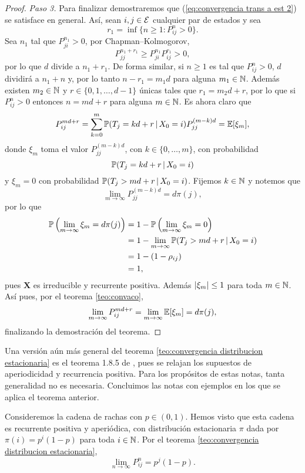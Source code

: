 \begin{proof}
    \emph{Paso 3.} Para finalizar demostraremos que (\ref{eq:convergencia trans a est 2}) se satisface en general. Así, sean $i, j \in \mathcal{E}$ cualquier par de estados y sea 
    \[
        r_1 = \inf\{n \geq 1 : P_{ij}^n > 0\}.    
    \]
    Sea $n_1$ tal que $P_{ji}^{n_1} > 0$, por Chapman--Kolmogorov, 
    \[
        P_{jj}^{n_1+r_1} \geq P_{ji}^{n_1} P_{ij}^{r_1} > 0,
    \]
    por lo que $d$ divide a $n_1+r_1$. De forma similar, si $n \geq 1$ es tal que $P_{ij}^n > 0$, $d$ dividirá a $n_1+n$ y, por lo tanto $n-r_1 = m_1d$ para alguna $m_1 \in \mathbb{N}$. Además existen $m_2 \in \mathbb{N}$ y $r \in \{0, 1,\ldots, d-1\}$ únicas tales que $r_1 = m_2 d + r$, por lo que si $P_{ij}^n > 0$ entonces $n = md + r$ para alguna $m \in \mathbb{N}$. Es ahora claro que
    \[
        P_{ij}^{md+r} = \sum_{k = 0}^m \mathbb{P}(T_j = kd+r \,\vert\, X_0 = i) P_{jj}^{(m-k)d} = \mathbb{E}[\xi_m],
    \]
    donde $\xi_m$ toma el valor $P_{jj}^{(m-k)d}$, con $k \in \{0, \ldots, m\}$, con probabilidad 
    \[
        \mathbb{P}(T_j = kd+r \,\vert\, X_0 = i)
    \] y $\xi_m = 0$ con probabilidad $\mathbb{P}(T_j > md + r \,\vert\, X_0 = i)$. Fijemos $k \in \mathbb{N}$ y notemos que 
    \[
        \lim_{m \to \infty} P_{jj}^{(m-k) d} = d\pi(j), 
    \] 
    por lo que 
    \begin{align*}
        \mathbb{P} \left(\lim_{m \to \infty} \xi_m = d\pi(j)\right) & = 1 - \mathbb{P} \left(\lim_{m \to \infty} \xi_m = 0 \right) \\
        & = 1 - \lim_{m \to \infty} \mathbb{P}(T_j > md+r \,\vert\, X_0 = i) \\
        & = 1 - (1 - \rho_{ij}) \\
        & = 1,
    \end{align*}
    pues $\bm X$ es irreducible y recurrente positiva. Además $\left\lvert \xi_m \right\rvert \leq 1$ para toda $m \in \mathbb{N}$. Así pues, por el teorema \ref{teo:convaco}, 
    \[
        \lim_{m \to \infty} P_{ij}^{md+r} = \lim_{m \to \infty} \mathbb{E}[\xi_m] = d\pi(j),    
    \]
    finalizando la demostración del teorema.
\end{proof}

Una versión aún más general del teorema \ref{teo:convergencia distribucion estacionaria} es el teorema 1.8.5 de \cite{Norris97}, pues se relajan los supuestos de aperiodicidad y recurrencia positiva. Para los propósitos de estas notas, tanta generalidad no es necesaria. Concluimos las notas con ejemplos en los que se aplica el teorema anterior.

\begin{example}
    Consideremos la cadena de rachas con $p \in (0,1)$. Hemos visto que esta cadena es recurrente positiva y aperiódica, con distribución estacionaria $\pi$ dada por $\pi(i) = p^i (1-p)$ para toda $i \in \mathbb{N}$. Por el teorema \ref{teo:convergencia distribucion estacionaria}, 
    \[
        \lim_{n \to \infty} P_{ij}^n = p^j (1-p).
    \]
\end{example}

